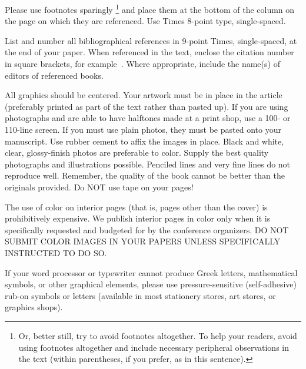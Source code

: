 \documentclass[times, 10pt,two column]{article}
\begin{document}

Please use footnotes sparingly%
\footnote
   {%
     Or, better still, try to avoid footnotes altogether.  To help your 
     readers, avoid using footnotes altogether and include necessary 
     peripheral observations in the text (within parentheses, if you 
     prefer, as in this sentence).
   }
and place them at the bottom of the column on the page on which they are 
referenced. Use Times 8-point type, single-spaced.



List and number all bibliographical references in 9-point Times, 
single-spaced, at the end of your paper. When referenced in the text, 
enclose the citation number in square brackets, for example~\cite{ex1}. 
Where appropriate, include the name(s) of editors of referenced books.


All graphics should be centered. Your artwork must be in place in the 
article (preferably printed as part of the text rather than pasted up). 
If you are using photographs and are able to have halftones made at a 
print shop, use a 100- or 110-line screen. If you must use plain photos, 
they must be pasted onto your manuscript. Use rubber cement to affix the 
images in place. Black and white, clear, glossy-finish photos are 
preferable to color. Supply the best quality photographs and 
illustrations possible. Penciled lines and very fine lines do not 
reproduce well. Remember, the quality of the book cannot be better than 
the originals provided. Do NOT use tape on your pages!


The use of color on interior pages (that is, pages other
than the cover) is prohibitively expensive. We publish interior pages in 
color only when it is specifically requested and budgeted for by the 
conference organizers. DO NOT SUBMIT COLOR IMAGES IN YOUR 
PAPERS UNLESS SPECIFICALLY INSTRUCTED TO DO SO.


If your word processor or typewriter cannot produce Greek letters, 
mathematical symbols, or other graphical elements, please use 
pressure-sensitive (self-adhesive) rub-on symbols or letters (available 
in most stationery stores, art stores, or graphics shops).
\end{document}

